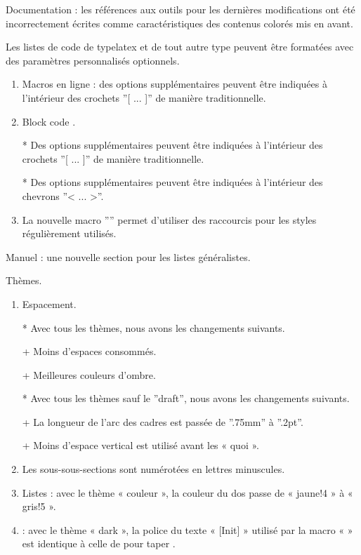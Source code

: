 \begin{tdocfix}
	\item Documentation : les références aux outils pour les dernières modifications ont été incorrectement écrites comme caractéristiques des contenus colorés mis en avant.
\end{tdocfix}


\begin{tdocnew}
	\item Les listes de code de typelatex et de tout autre type peuvent être formatées avec des paramètres personnalisés optionnels.
	\begin{enumerate}
		\item Macros en ligne : des options supplémentaires peuvent être indiquées à l'intérieur des crochets ''[ ... ]'' de manière traditionnelle.

		\item Block code \envs.

		* Des options supplémentaires peuvent être indiquées à l'intérieur des crochets ''[ ... ]'' de manière traditionnelle.

		* Des options supplémentaires \tcolorbox peuvent être indiquées à l'intérieur des chevrons ''< ... >''.

		\item La nouvelle macro ''\tdoctcb'' permet d'utiliser des raccourcis pour les styles régulièrement utilisés.
	\end{enumerate}

	\item Manuel : une nouvelle section pour les listes généralistes.
\end{tdocnew}


\begin{tdocupdate}
	\item Thèmes.
	\begin{enumerate}
		\item Espacement.

			* Avec tous les thèmes, nous avons les changements suivants.

				+ Moins d'espaces consommés.

				+ Meilleures couleurs d'ombre.

			* Avec tous les thèmes sauf le ''draft'', nous avons les changements suivants.

				+ La longueur de l'arc des cadres est passée de ''.75mm'' à ''.2pt''.

				+ Moins d'espace vertical est utilisé avant les  « quoi ».


		\item Les sous-sous-sections sont numérotées en lettres minuscules.

		\item Listes \latex : avec le thème « couleur », la couleur du dos passe de « jaune!4 » à « gris!5 ».

		\item \Chges : avec le thème « dark », la police du texte « [Init] » utilisé par la macro « \tdocstartproj » est identique à celle de \envs pour taper \chges.
	\end{enumerate}
\end{tdocupdate}
